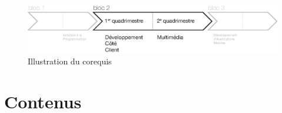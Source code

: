 \begin{figure}[H]
    \begin{center}
        \includegraphics[width=\textwidth]{figures/corequis.eps}
        \caption{Illustration du corequis}
        \label{Fig:GQM}
    \end{center}
\end{figure}
\clearpage

\section{Contenus}

